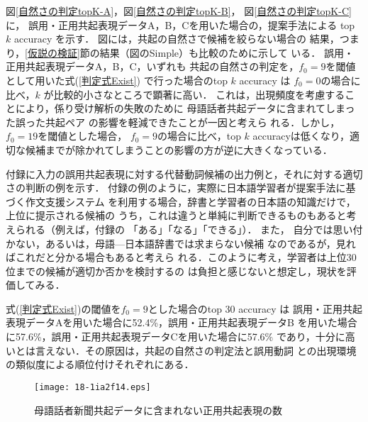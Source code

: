 \documentclass[japanese]{jnlp_1.4}
\begin{document}
図\ref{自然さの判定topK-A}，図\ref{自然さの判定topK-B}，
図\ref{自然さの判定topK-C}に，
誤用・正用共起表現データA，B，Cを用いた場合の，提案手法による top $k$
accuracy を示す．
図には，共起の自然さで候補を絞らない場合の
結果，つまり，\ref{仮説の検証}節の結果（図のSimple）も比較のために示して
いる．
誤用・正用共起表現データA，B，C，いずれも
共起の自然さの判定を，$f_{0}=9$を閾値として用いた式(\ref{判定式Exist}) 
で行った場合のtop $k$ accuracy は
$f_{0}=0$の場合に比べ，$k$ が比較的小さなところで顕著に高い．
これは，出現頻度を考慮することにより，係り受け解析の失敗のために
母語話者共起データに含まれてしまった誤った共起ペア
の影響を軽減できたことが一因と考えら
れる．しかし，$f_{0}=19$を閾値とした場合，
$f_{0}=9$の場合に比べ，top $k$ accuracyは低くなり，適
切な候補までが除かれてしまうことの影響の方が逆に大きくなっている．

付録に入力の誤用共起表現に対する代替動詞候補の出力例と，それに対する適切
さの判断の例を示す．
付録の例のように，実際に日本語学習者が提案手法に基づく作文支援システム
を利用する場合，辞書と学習者の日本語の知識だけで，上位に提示される候補の
うち，これは違うと単純に判断できるものもあると考えられる（例えば，付録の
「ある」「なる」「できる」）．
また，
自分では思い付かない，あるいは，母語—日本語辞書では求まらない候補
なのであるが，見ればこれだと分かる場合もあると考えら
れる．このように考え，学習者は上位30位までの候補が適切か否かを検討するの
は負担と感じないと想定し，現状を評価してみる．

式(\ref{判定式Exist})の閾値を$f_{0}=9$とした場合のtop 30 accuracy は
誤用・正用共起表現データAを用いた場合に52.4\%，誤用・正用共起表現データB
を用いた場合に57.6\%，誤用・正用共起表現データCを用いた場合に57.6\%
であり，十分に高いとは言えない．その原因は，共起の自然さの判定法と誤用動詞
との出現環境の類似度による順位付けそれぞれにある．

\begin{figure}[b]
\begin{center}
\texttt{[image: 18-1ia2f14.eps]}
\end{center}
\caption{母語話者新聞共起データに含まれない正用共起表現の数} 
\label{コーパス比較_未知語}
\end{figure}
\end{document}
